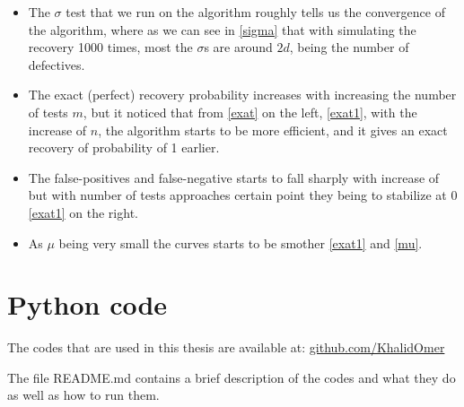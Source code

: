 \begin{itemize}
	\item The $ \sigma $ test that we run on the algorithm roughly tells us the convergence of the algorithm, where as we can see in  \ref{sigma} that with simulating the recovery 1000 times, most the $ \sigma $s are around $ 2d $, being the number of defectives. 
	
	\item The exact (perfect) recovery probability increases with increasing the number of tests $ m $,  but it noticed that from \ref{exat} on the left, \ref{exat1}, with the increase of $ n $, the algorithm starts to be more efficient, and it gives an exact recovery of probability of 1 earlier.    
	\item The false-positives and false-negative starts to fall sharply with increase of but with number of tests approaches certain point they being to stabilize at 0 \ref{exat1} on the right. 
	
	\item As $ \mu $ being very small the curves starts to be smother \ref{exat1} and \ref{mu}.    
\end{itemize}
 \section{Python code}
 
 The codes that are used in this thesis are available at: \href{https://github.com/KhalidOmer/School_thesis/tree/main}{github.com/KhalidOmer}
 
 
 The file README.md contains a brief description of the codes and what they do as well as how to
 run them.